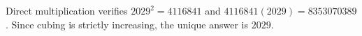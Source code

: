 Direct multiplication verifies $2029^2=4116841$ and $4116841(2029)=8353070389$. Since cubing is strictly increasing, the unique answer is $\boxed{2029}$.
